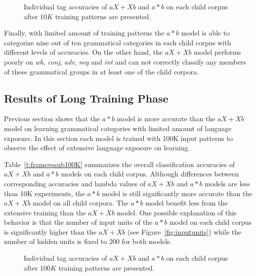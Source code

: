 \begin{figure}[h]
 \caption{Individual tag accuracies of $aX+Xb$ and $a*b$ on each child corpus
 after $10K$ training patterns are presented.}
  \label{fig:category10K}
\end{figure}

Finally, with limited amount of training patterns the $a*b$ model is able to
categorize nine out of ten grammatical categories in each child corpus with
different levels of accuracies.  On the other hand, the $aX+Xb$ model performs
poorly on {\it wh}, {\it conj}, {\it adv}, {\it neg} and {\it int} and can not
correctly classify any members of these grammatical groups in at least one of
the child corpora.

\subsection{Results of Long Training Phase} 

Previous section shows that the $a*b$ model is more accurate than the $aX+Xb$
model on learning grammatical categories with limited amount of language
exposure.  In this section each model is trained with 100K input patterns to
observe the effect of extensive language exposure on learning.


Table~\ref{t:framevssub100K} summarizes the overall classification accuracies
of $aX+Xb$ and $a*b$ models on each child corpus.  Although differences between
corresponding accuracies and lambda values of $aX+Xb$ and $a*b$ models are less
than 10K experiments, the $a*b$ model is still significantly more accurate than
the $aX+Xb$ model on all child corpora.  The $a*b$ model benefit less from the
extensive training than the $aX+Xb$ model. One possible explanation of this
behavior is that the number of input units of the $a*b$ model on each child
corpus is significantly higher than the $aX+Xb$ (see
Figure~\ref{fig:inputunits}) while the number of hidden units is fixed to 200
for both models. 

\begin{figure}[h]
  \caption{Individual tag accuracies of $aX+Xb$ and $a*b$ on each child corpus
  after $100K$ training patterns are presented.}  
  \label{fig:category100K}
\end{figure}

